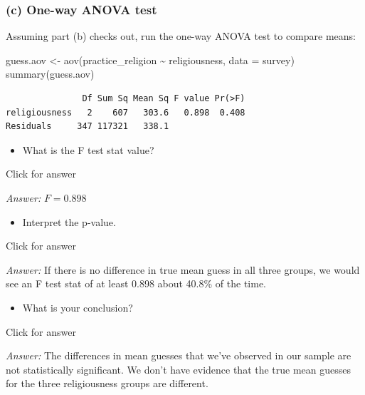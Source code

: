 \documentclass[
]{book}
\newenvironment{Shaded}{\begin{snugshade}}{\end{snugshade}}
\newcommand{\AttributeTok}[1]{\textcolor[rgb]{0.77,0.63,0.00}{#1}}
\newcommand{\FunctionTok}[1]{\textcolor[rgb]{0.00,0.00,0.00}{#1}}
\newcommand{\NormalTok}[1]{#1}
\newcommand{\OtherTok}[1]{\textcolor[rgb]{0.56,0.35,0.01}{#1}}
\newcommand{\SpecialCharTok}[1]{\textcolor[rgb]{0.00,0.00,0.00}{#1}}
\providecommand{\tightlist}{%
  \setlength{\itemsep}{0pt}\setlength{\parskip}{0pt}}
\begin{document}
\hypertarget{c-one-way-anova-test}{%
\subsubsection{(c) One-way ANOVA test}\label{c-one-way-anova-test}}

Assuming part (b) checks out, run the one-way ANOVA test to compare means:

\begin{Shaded}
\begin{Highlighting}[]
\NormalTok{guess.aov }\OtherTok{\textless{}{-}} \FunctionTok{aov}\NormalTok{(practice\_religion }\SpecialCharTok{\textasciitilde{}}\NormalTok{ religiousness, }\AttributeTok{data =}\NormalTok{ survey)}
\FunctionTok{summary}\NormalTok{(guess.aov)}
\end{Highlighting}
\end{Shaded}

\begin{verbatim}
               Df Sum Sq Mean Sq F value Pr(>F)
religiousness   2    607   303.6   0.898  0.408
Residuals     347 117321   338.1               
\end{verbatim}

\begin{itemize}
\tightlist
\item
  What is the F test stat value?
\end{itemize}

Click for answer

\emph{Answer:} \(F = 0.898\)

\begin{itemize}
\tightlist
\item
  Interpret the p-value.
\end{itemize}

Click for answer

\emph{Answer:} If there is no difference in true mean guess in all three groups, we would see an F test stat of at least 0.898 about 40.8\% of the time.

\begin{itemize}
\tightlist
\item
  What is your conclusion?
\end{itemize}

Click for answer

\emph{Answer:} The differences in mean guesses that we've observed in our sample are not statistically significant. We don't have evidence that the true mean guesses for the three religiousness groups are different.
\end{document}
